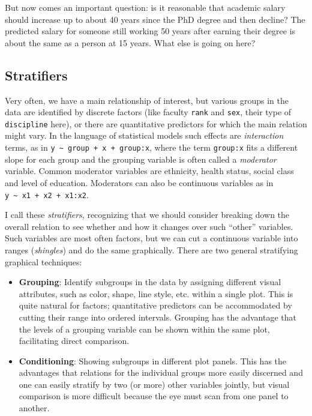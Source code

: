 \documentclass[
  letterpaper,
  10pt,
  krantz2]{krantz}
\begin{document}
But now comes an important question: is it reasonable that academic
salary should increase up to about 40 years since the PhD degree and
then decline? The predicted salary for someone still working 50 years
after earning their degree is about the same as a person at 15 years.
What else is going on here?

\hypertarget{stratifiers}{%
\subsection{Stratifiers}\label{stratifiers}}

Very often, we have a main relationship of interest, but various groups
in the data are identified by discrete factors (like faculty
\texttt{rank} and \texttt{sex}, their type of \texttt{discipline} here),
or there are quantitative predictors for which the main relation might
vary. In the language of statistical models such effects are
\emph{interaction} terms, as in
\texttt{y\ \textasciitilde{}\ group\ +\ x\ +\ group:x}, where the term
\texttt{group:x} fits a different slope for each group and the grouping
variable is often called a \emph{moderator} variable. Common moderator
variables are ethnicity, health status, social class and level of
education. Moderators can also be continuous variables as in
\texttt{y\ \textasciitilde{}\ x1\ +\ x2\ +\ x1:x2}.

I call these \emph{stratifiers}, recognizing that we should consider
breaking down the overall relation to see whether and how it changes
over such ``other'' variables. Such variables are most often factors,
but we can cut a continuous variable into ranges (\emph{shingles}) and
do the same graphically. There are two general stratifying graphical
techniques:

\begin{itemize}
\item
  \textbf{Grouping}: Identify subgroups in the data by assigning
  different visual attributes, such as color, shape, line style, etc.
  within a single plot. This is quite natural for factors; quantitative
  predictors can be accommodated by cutting their range into ordered
  intervals. Grouping has the advantage that the levels of a grouping
  variable can be shown within the same plot, facilitating direct
  comparison.
\item
  \textbf{Conditioning}: Showing subgroups in different plot panels.
  This has the advantages that relations for the individual groups more
  easily discerned and one can easily stratify by two (or more) other
  variables jointly, but visual comparison is more difficult because the
  eye must scan from one panel to another.
\end{itemize}
\end{document}
